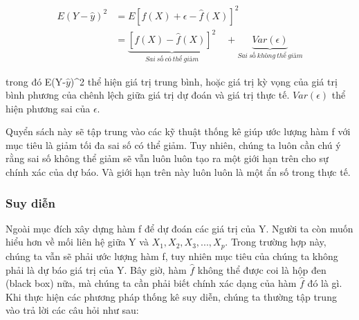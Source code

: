 \documentclass[
]{article}
\begin{document}
\begin{align}
E(Y-\hat{y})^2 &= E[f(X) + \epsilon - \hat{f}(X)]^2 \\
&= \underbrace{[f(X) - \hat{f}(X)]^2}_{Sai \ số \ có \ thể \ giảm} \quad + \underbrace{Var(\epsilon)}_{Sai \ số \ không \ thể \ giảm}
\label{eq:re_irre_error}
\end{align}

trong đó E(Y-\(\hat{y}\))\^{}2 thể hiện giá trị trung bình, hoặc giá trị kỳ vọng của giá trị bình phương của chênh lệch giữa giá trị dự đoán và giá trị thực tế. \(Var(\epsilon)\) thể hiện phương sai của \(\epsilon\).

Quyển sách này sẽ tập trung vào các kỹ thuật thống kê giúp ước lượng hàm f với mục tiêu là giảm tối đa sai số có thể giảm. Tuy nhiên, chúng ta luôn cần chú ý rằng sai số không thể giảm sẽ vẫn luôn luôn tạo ra một giới hạn trên cho sự chính xác của dự báo. Và giới hạn trên này luôn luôn là một ẩn số trong thực tế.

\hypertarget{suy-diux1ec5n}{%
\subsubsection{Suy diễn}\label{suy-diux1ec5n}}

Ngoài mục đích xây dựng hàm f để dự đoán các giá trị của Y. Người ta còn muốn hiểu hơn về mối liên hệ giữa Y và \(X_1, X_2, X_3,...,X_p\). Trong trường hợp này, chúng ta vẫn sẽ phải ước lượng hàm f, tuy nhiên mục tiêu của chúng ta không phải là dự báo giá trị của Y. Bây giờ, hàm \(\hat{f}\) không thể được coi là hộp đen (black box) nữa, mà chúng ta cần phải biết chính xác dạng của hàm \(\hat{f}\) đó là gì. Khi thực hiện các phương pháp thống kê suy diễn, chúng ta thường tập trung vào trả lời các câu hỏi như sau:
\end{document}
